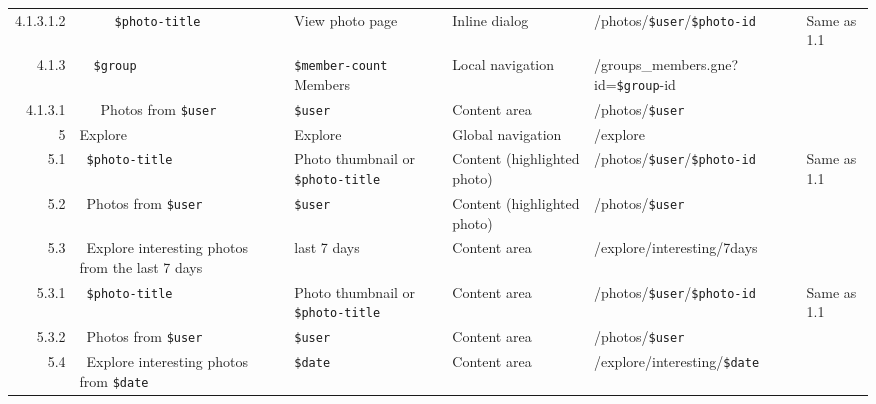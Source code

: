 \documentclass[12pt,a4paper]{article}
\newcommand{\var}[1]{\texttt{\${#1}}}
\begin{document}
\begin{landscape}
\begin{table}[h!b!p!]
\begin{center}
\begin{tiny}
\begin{tabular}{r|l|l|l|l|p{3cm}}
                    4.1.3.1.2 &
                    ~~~~~\var{photo-title} &
                    View photo page &
                    Inline dialog &
                    /photos/\var{user}/\var{photo-id} &
                    Same as 1.1 \\

                4.1.3 &
                ~~\var{group}  &
                \var{member-count} Members &
                Local navigation &
                /groups\_members.gne?id=\var{group}-id &
                \\

                  4.1.3.1 &
                  ~~~Photos from \var{user} &
                  \var{user} &
                  Content area &
                  /photos/\var{user} &
                  \\


            5 &
            Explore &
            Explore &
            Global navigation &
            /explore &
            \\

              5.1 &
              ~\var{photo-title} &
              Photo thumbnail or \var{photo-title} &
              Content (highlighted photo) &
              /photos/\var{user}/\var{photo-id} &
              Same as 1.1 \\

              5.2 &
              ~Photos from \var{user} &
              \var{user} &
              Content (highlighted photo) &
              /photos/\var{user} &
              \\

              5.3 &
              ~Explore interesting photos from the last 7 days &
              last 7 days &
              Content area &
              /explore/interesting/7days &
              \\

                5.3.1 &
                ~\var{photo-title} &
                Photo thumbnail or \var{photo-title} &
                Content area &
                /photos/\var{user}/\var{photo-id} &
                Same as 1.1 \\

                5.3.2 &
                ~Photos from \var{user} &
                \var{user} &
                Content area &
                /photos/\var{user} &
                \\

              5.4 &
              ~Explore interesting photos from \var{date} &
              \var{date} &
              Content area &
              /explore/interesting/\var{date} &
              \\


\end{tabular}
\end{tiny}
\end{center}
\end{table}
\end{landscape}
\end{document}
